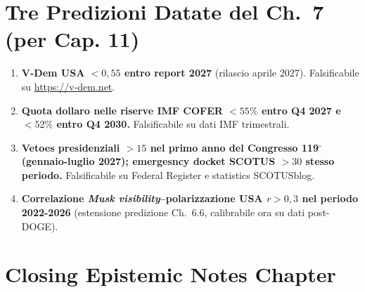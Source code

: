 \section{Tre Predizioni Datate del Ch.~7 (per Cap.
11)}\label{tre-predizioni-datate-del-cap.-7-per-cap.-11}

\begin{enumerate}
\def\labelenumi{\arabic{enumi}.}
\tightlist
\item
  \textbf{V-Dem USA \(< 0{,}55\) entro report 2027} (rilascio aprile
  2027). Falsificabile su \url{https://v-dem.net}.
\item
  \textbf{Quota dollaro nelle riserve IMF COFER \(< 55\%\) entro Q4 2027
  e \(< 52\%\) entro Q4 2030.} Falsificabile su dati IMF trimestrali.
\item
  \textbf{Vetoes presidenziali \(> 15\) nel primo anno del Congresso
  119$^\circ$ (gennaio-luglio 2027); emergesncy docket SCOTUS \(> 30\) stesso
  periodo.} Falsificabile su Federal Register e statistics SCOTUSblog.
\item
  \textbf{Correlazione \emph{Musk visibility}--polarizzazione USA
  \(r > 0{,}3\) nel periodo 2022-2026} (estensione predizione Ch.~6.6,
  calibrabile ora su dati post-DOGE).
\end{enumerate}



\section{Closing Epistemic Notes
Chapter}\label{note-epistemiche-di-chiusura-chapter}

